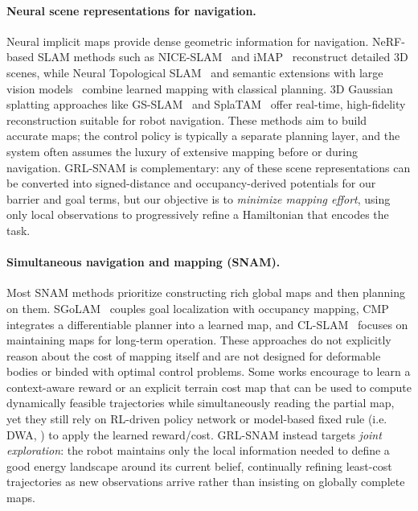 \paragraph{Neural scene representations for navigation.}
Neural implicit maps provide dense geometric information for navigation. NeRF-based SLAM methods such as NICE-SLAM~\citep{zhu2022nice} and iMAP~\citep{sucar2021imap} reconstruct detailed 3D scenes, while Neural Topological SLAM~\citep{chaplot2020neural} and semantic extensions with large vision models~\citep{zheng2025semantic} combine learned mapping with classical planning. 3D Gaussian splatting approaches like GS-SLAM~\citep{yan2024gs} and SplaTAM~\citep{keetha2024splatam} offer real-time, high-fidelity reconstruction suitable for robot navigation. These methods aim to build accurate maps; the control policy is typically a separate planning layer, and the system often assumes the luxury of extensive mapping before or during navigation. GRL-SNAM is complementary: any of these scene representations can be converted into signed-distance and occupancy-derived potentials for our barrier and goal terms, but our objective is to \emph{minimize mapping effort}, using only local observations to progressively refine a Hamiltonian that encodes the task.

\paragraph{Simultaneous navigation and mapping (SNAM).}
Most SNAM methods prioritize constructing rich global maps and then planning on them. SGoLAM~\citep{sgolam2021} couples goal localization with occupancy mapping, CMP~\citep{gupta2017cognitive} integrates a differentiable planner into a learned map, and CL-SLAM~\citep{clslam2022} focuses on maintaining maps for long-term operation. These approaches do not explicitly reason about the cost of mapping itself and are not designed for deformable bodies or binded with optimal control problems. Some works encourage to learn a context-aware reward \citep{liang2023context} or an explicit terrain cost map \citep{sathyamoorthy2022terrapn} that can be used to compute dynamically feasible trajectories while simultaneously reading the partial map, yet they still rely on RL-driven policy network or model-based fixed rule (i.e. DWA, \citet{fox2002dynamic}) to apply the learned reward/cost. GRL-SNAM instead targets \emph{joint exploration}: the robot maintains only the local information needed to define a good energy landscape around its current belief, continually refining least-cost trajectories as new observations arrive rather than insisting on globally complete maps.

